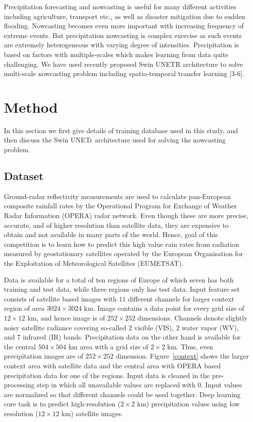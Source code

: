 \documentclass{article}
\begin{document}
Precipitation forecasting and nowcasting is useful for many different activities including agriculture, transport etc., as well as disaster mitigation due to sudden flooding. Nowcasting becomes even more important with increasing frequency of extreme events. But precipitation nowcasting is complex exercise as such events are extremely heterogeneous with varying degree of intensities. Precipitation is based on factors with multiple-scales which makes learning from data quite challenging. We have used recently proposed Swin UNETR architecture to solve multi-scale nowcasting problem including spatio-temporal transfer learning [3-6].

\section{Method}

In this section we first give details of training database used in this study, and then discuss the Swin UNETr architecture used for solving the nowcasting problem.

\subsection{Dataset}

Ground-radar reflectivity measurements are used to calculate pan-European composite rainfall rates by the Operational Program for Exchange of Weather Radar Information (OPERA) radar network. Even though these are more precise, accurate, and of higher resolution than satellite data, they are expensive to obtain and not available in many parts of the world. Hence, goal of this competition is to learn how to predict this high value rain rates from radiation measured by geostationary satellites operated by the European Organisation for the Exploitation of Meteorological Satellites (EUMETSAT).

Data is available for a total of ten regions of Europe of which seven has both training and test data, while three regions only has test data. Input feature set consists of satellite based images with $11$ different channels for larger context region of area $3024\times3024$ km. Image contains a data point for every grid size of $12\times12$ km, and hence image is of $252\times252$ dimensions. Channels denote slightly noisy satellite radiance covering so-called $2$ visible (VIS), $2$ water vapor (WV), and $7$ infrared (IR) bands. Precipitation data on the other hand is available for the central $504\times504$ km area with a grid size of $2\times2$ km. Thus, even precipitation images are of $252\times252$ dimension. Figure~\ref{context} shows the larger context area with satellite data and the central area with OPERA based precipitation data for one of the regions. Input data is cleaned in the pre-processing step in which all unavailable values are replaced with $0$. Input values are normalized so that different channels could be used together. Deep learning core task is to predict high-resolution ($2\times2$ km) precipitation values using low resolution ($12\times12$ km) satellite images.
\end{document}
